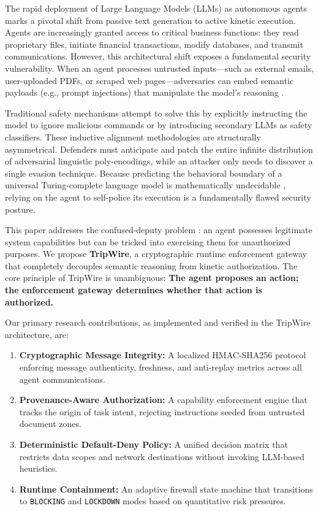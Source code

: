 \documentclass[10pt,a4paper]{article}
\begin{document}
The rapid deployment of Large Language Models (LLMs) as autonomous agents marks a pivotal shift from passive text generation to active kinetic execution. Agents are increasingly granted access to critical business functions: they read proprietary files, initiate financial transactions, modify databases, and transmit communications. However, this architectural shift exposes a fundamental security vulnerability. When an agent processes untrusted inputs---such as external emails, user-uploaded PDFs, or scraped web pages---adversaries can embed semantic payloads (e.g., prompt injections) that manipulate the model's reasoning \cite{prompt_injection}.

Traditional safety mechanisms attempt to solve this by explicitly instructing the model to ignore malicious commands or by introducing secondary LLMs as safety classifiers. These inductive alignment methodologies are structurally asymmetrical. Defenders must anticipate and patch the entire infinite distribution of adversarial linguistic poly-encodings, while an attacker only needs to discover a single evasion technique. Because predicting the behavioral boundary of a universal Turing-complete language model is mathematically undecidable \cite{rice1953}, relying on the agent to self-police its execution is a fundamentally flawed security posture.

This paper addresses the confused-deputy problem \cite{hardy1988}: an agent possesses legitimate system capabilities but can be tricked into exercising them for unauthorized purposes. We propose \textbf{TripWire}, a cryptographic runtime enforcement gateway that completely decouples semantic reasoning from kinetic authorization. The core principle of TripWire is unambiguous: \textbf{The agent proposes an action; the enforcement gateway determines whether that action is authorized.}

Our primary research contributions, as implemented and verified in the TripWire architecture, are:
\begin{enumerate}
    \item \textbf{Cryptographic Message Integrity:} A localized HMAC-SHA256 protocol \cite{rfc2104} enforcing message authenticity, freshness, and anti-replay metrics across all agent communications.
    \item \textbf{Provenance-Aware Authorization:} A capability enforcement engine \cite{levy1984} that tracks the origin of task intent, rejecting instructions seeded from untrusted document zones.
    \item \textbf{Deterministic Default-Deny Policy:} A unified decision matrix that restricts data scopes and network destinations without invoking LLM-based heuristics.
    \item \textbf{Runtime Containment:} An adaptive firewall state machine that transitions to \texttt{BLOCKING} and \texttt{LOCKDOWN} modes based on quantitative risk pressures.
\end{enumerate}
\end{document}
